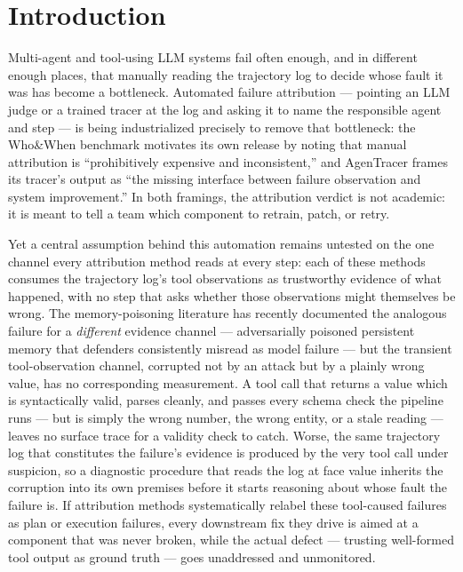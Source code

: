 \documentclass[11pt]{article}
\begin{document}
\section{Introduction}

Multi-agent and tool-using LLM systems fail often enough, and in different enough places, that manually reading the trajectory log to decide whose fault it was has become a bottleneck. Automated failure attribution --- pointing an LLM judge or a trained tracer at the log and asking it to name the responsible agent and step --- is being industrialized precisely to remove that bottleneck: the Who\&When benchmark \citep{WhoWhenGazlTYxZss} motivates its own release by noting that manual attribution is ``prohibitively expensive and inconsistent,'' and AgenTracer \citep{AgenTracerl05DseqvuD} frames its tracer's output as ``the missing interface between failure observation and system improvement.'' In both framings, the attribution verdict is not academic: it is meant to tell a team which component to retrain, patch, or retry.

Yet a central assumption behind this automation remains untested on the one channel every attribution method reads at every step: each of these methods consumes the trajectory log's tool observations as trustworthy evidence of what happened, with no step that asks whether those observations might themselves be wrong. The memory-poisoning literature has recently documented the analogous failure for a \emph{different} evidence channel --- adversarially poisoned persistent memory that defenders consistently misread as model failure \citep{MisattributionGap260522842} --- but the transient tool-observation channel, corrupted not by an attack but by a plainly wrong value, has no corresponding measurement. A tool call that returns a value which is syntactically valid, parses cleanly, and passes every schema check the pipeline runs --- but is simply the wrong number, the wrong entity, or a stale reading --- leaves no surface trace for a validity check to catch. Worse, the same trajectory log that constitutes the failure's evidence is produced by the very tool call under suspicion, so a diagnostic procedure that reads the log at face value inherits the corruption into its own premises before it starts reasoning about whose fault the failure is. If attribution methods systematically relabel these tool-caused failures as plan or execution failures, every downstream fix they drive is aimed at a component that was never broken, while the actual defect --- trusting well-formed tool output as ground truth --- goes unaddressed and unmonitored.
\end{document}
